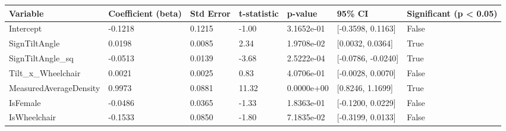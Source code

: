 \begin{tabular}{lllllll}
\hline
Variable & Coefficient (beta) & Std Error & t-statistic & p-value & 95\% CI & Significant (p < 0.05) \\ \hline
Intercept & -0.1218 & 0.1215 & -1.00 & 3.1652e-01 & [-0.3598, 0.1163] & False \\
SignTiltAngle & 0.0198 & 0.0085 & 2.34 & 1.9708e-02 & [0.0032, 0.0364] & True \\
SignTiltAngle\_sq & -0.0513 & 0.0139 & -3.68 & 2.5222e-04 & [-0.0786, -0.0240] & True \\
Tilt\_x\_Wheelchair & 0.0021 & 0.0025 & 0.83 & 4.0706e-01 & [-0.0028, 0.0070] & False \\
MeasuredAverageDensity & 0.9973 & 0.0881 & 11.32 & 0.0000e+00 & [0.8246, 1.1699] & True \\
IsFemale & -0.0486 & 0.0365 & -1.33 & 1.8363e-01 & [-0.1200, 0.0229] & False \\
IsWheelchair & -0.1533 & 0.0850 & -1.80 & 7.1835e-02 & [-0.3199, 0.0133] & False \\
\hline
\end{tabular}
